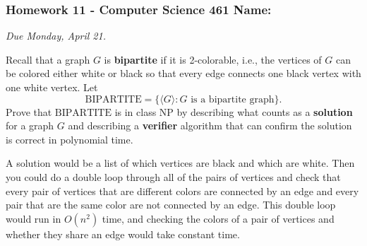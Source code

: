 \documentclass[12pt]{exam}
\begin{document}
\pagestyle{empty}
\subsubsection*{Homework 11 - Computer Science 461 \hfill Name: \underline{\hspace*{2in}}}

\textit{Due Monday, April 21.} %

\begin{questions}
\question Recall that a graph $G$ is \textbf{bipartite} if it is 2-colorable, i.e., the vertices of $G$ can be colored either white or black so that every edge connects one black vertex with one white vertex.  Let
$$\text{BIPARTITE} = \{ \langle G \rangle : G \text{ is a bipartite graph}\}.$$
Prove that $\text{BIPARTITE}$ is in class NP by describing what counts as a \textbf{solution} for a graph $G$ and describing a \textbf{verifier} algorithm that can confirm the solution is correct in polynomial time. 
\begin{solution}
A solution would be a list of which vertices are black and which are white.  Then you could do a double loop through all of the pairs of vertices and check that every pair of vertices that are different colors are connected by an edge and every pair that are the same color are not connected by an edge.  This double loop would run in $O(n^2)$ time, and checking the colors of a pair of vertices and whether they share an edge would take constant time.  
\end{solution}
\vfill




\end{questions}
\end{document}
